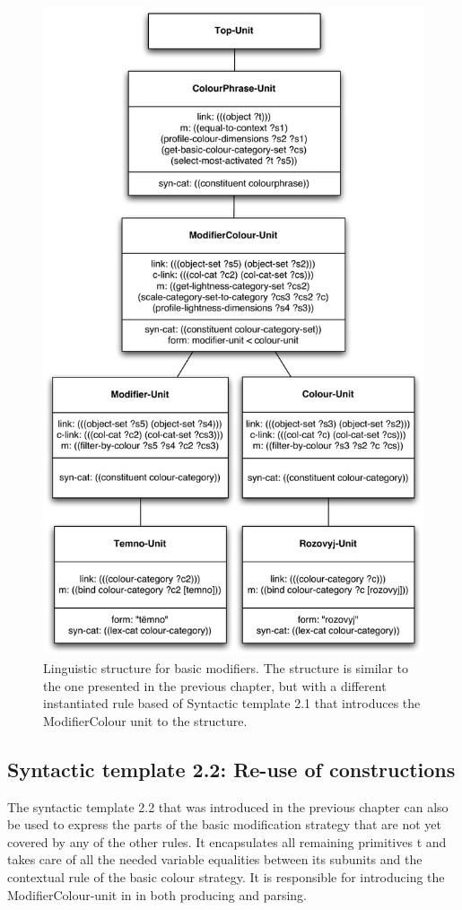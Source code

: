 \begin{figure}[htbp]
  \centering
  \includegraphics[width=.8\textwidth]{./achromatic/figures/linguistic-structure.pdf}
  \caption[Linguistic structure for basic modifiers]{Linguistic
    structure for basic modifiers. The structure is similar to the
    one presented in the previous chapter, but with a different
    instantiated rule based of Syntactic template 2.1 that introduces
    the ModifierColour unit to the structure.}
  \label{f:ams-linguistic-structure}
\end{figure}

\subsection{Syntactic template 2.2: Re-use of constructions}

The syntactic template 2.2 that was introduced in the previous chapter
can also be used to express the parts of the basic
  modification strategy that are not yet covered by any of the other
rules. It encapsulates all remaining primitives t and takes care of
all the needed variable equalities between its subunits and the
contextual rule of the basic colour strategy. It is responsible for
introducing the ModifierColour-unit in  in both producing and parsing.

